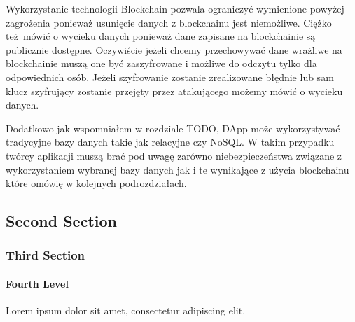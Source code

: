 \documentclass[]{llncs}
\begin{document}
  Wykorzystanie technologii Blockchain pozwala ograniczyć wymienione powyżej
  zagrożenia ponieważ usunięcie danych z blockchainu jest niemożliwe. Ciężko
  też mówić o wycieku danych ponieważ dane zapisane na blockchainie są
  publicznie dostępne. Oczywiście jeżeli chcemy przechowywać dane wrażliwe na
  blockchainie muszą one być zaszyfrowane i możliwe do odczytu tylko dla
  odpowiednich osób. Jeżeli szyfrowanie zostanie zrealizowane błędnie lub sam
  klucz szyfrujący zostanie przejęty przez atakującego możemy mówić o wycieku
  danych.

  Dodatkowo jak wspomniałem w rozdziale TODO, DApp może wykorzystywać tradycyjne
  bazy danych takie jak relacyjne czy NoSQL. W takim przypadku twórcy aplikacji
  muszą brać pod uwagę zarówno niebezpieczeństwa związane z wykorzystaniem
  wybranej bazy danych jak i te wynikające z użycia blockchainu które omówię w
  kolejnych podrozdziałach.

\subsection{Second Section}
\subsubsection{Third Section}
\paragraph{Fourth Level}
Lorem ipsum dolor sit amet, consectetur adipiscing elit.
\end{document}
